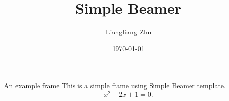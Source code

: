 \documentclass[lang=en,aspectratio=43,theme=retro,logo=on]{simplebeamer}
\title{Simple Beamer}
\author{Liangliang Zhu}
\date{\today}
\begin{document}
\maketitle

\begin{frame}{An example frame}
    This is a simple frame using Simple Beamer template.
    \begin{equation}
        x^{2} + 2x + 1 = 0.
    \end{equation}
\end{frame}
\end{document}
